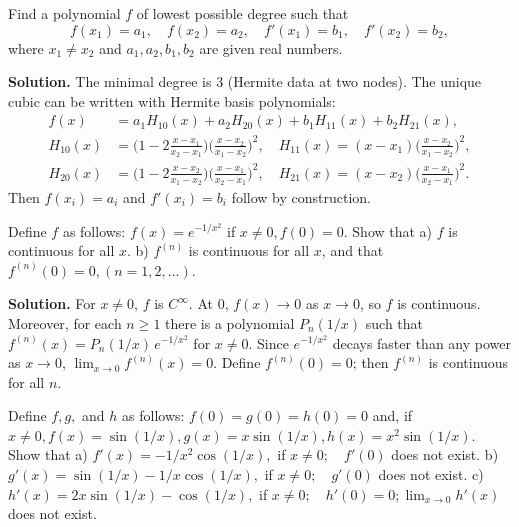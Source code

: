 \begin{problembox}
Find a polynomial \( f \) of lowest possible degree such that
\[ f(x_1) = a_1, \quad f(x_2) = a_2, \quad f'(x_1) = b_1, \quad f'(x_2) = b_2, \]
where \( x_1 \neq x_2 \) and \( a_1, a_2, b_1, b_2 \) are given real numbers.
\end{problembox}

\noindent\textbf{Solution.}
The minimal degree is $3$ (Hermite data at two nodes). The unique cubic can be written with Hermite basis polynomials:
\[\begin{aligned}
f(x)&=a_1 H_{10}(x)+a_2 H_{20}(x)+b_1 H_{11}(x)+b_2 H_{21}(x),\\
H_{10}(x)&=\Big(1-2\frac{x-x_1}{x_2-x_1}\Big)\Big(\frac{x-x_2}{x_1-x_2}\Big)^2,\quad H_{11}(x)=(x-x_1)\Big(\frac{x-x_2}{x_1-x_2}\Big)^2,\\
H_{20}(x)&=\Big(1-2\frac{x-x_2}{x_1-x_2}\Big)\Big(\frac{x-x_1}{x_2-x_1}\Big)^2,\quad H_{21}(x)=(x-x_2)\Big(\frac{x-x_1}{x_2-x_1}\Big)^2.
\end{aligned}\]
Then $f(x_i)=a_i$ and $f'(x_i)=b_i$ follow by construction.

\begin{problembox}
Define \( f \) as follows: \( f(x) = e^{-1/x^2} \) if \( x \neq 0, f(0) = 0 \). Show that
a) \( f \) is continuous for all \( x \).
b) \( f^{(n)} \) is continuous for all \( x \), and that \( f^{(n)}(0) = 0, (n = 1, 2, \ldots ) \).
\end{problembox}

\noindent\textbf{Solution.}
For $x\ne 0$, $f$ is $C^{\infty}$. At $0$, $f(x)\to 0$ as $x\to 0$, so $f$ is continuous. Moreover, for each $n\ge 1$ there is a polynomial $P_n(1/x)$ such that $f^{(n)}(x)=P_n(1/x)\,e^{-1/x^2}$ for $x\ne 0$. Since $e^{-1/x^2}$ decays faster than any power as $x\to 0$, $\lim_{x\to 0}f^{(n)}(x)=0$. Define $f^{(n)}(0)=0$; then $f^{(n)}$ is continuous for all $n$.

\begin{problembox}
Define \( f, g, \) and \( h \) as follows: \( f(0) = g(0) = h(0) = 0 \) and, if \( x \neq 0, f(x) = \sin (1/x), g(x) = x \sin (1/x), h(x) = x^2 \sin (1/x) \). Show that
a) \( f'(x) = -1/x^2 \cos (1/x), \) if \( x \neq 0; \quad f'(0) \) does not exist.
b) \( g'(x) = \sin (1/x) - 1/x \cos (1/x), \) if \( x \neq 0; \quad g'(0) \) does not exist.
c) \( h'(x) = 2x \sin (1/x) - \cos (1/x), \) if \( x \neq 0; \quad h'(0) = 0; \lim_{x \to 0} h'(x) \) does not exist.
\end{problembox}

